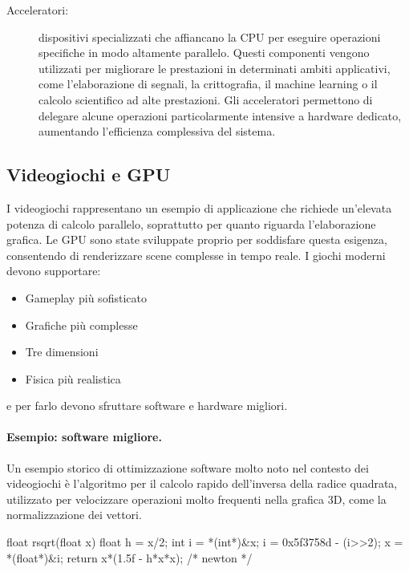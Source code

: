 \begin{description}
\item[Acceleratori:] dispositivi specializzati che affiancano la CPU per eseguire operazioni specifiche in modo altamente parallelo. 
Questi componenti vengono utilizzati per migliorare le prestazioni in determinati ambiti applicativi, come l'elaborazione di segnali, la crittografia, il machine learning o il calcolo scientifico ad alte prestazioni. 
Gli acceleratori permettono di delegare alcune operazioni particolarmente intensive a hardware dedicato, aumentando l'efficienza complessiva del sistema.

\end{description}

\subsection{Videogiochi e GPU}
I videogiochi rappresentano un esempio di applicazione che richiede un'elevata potenza di calcolo parallelo, soprattutto per quanto riguarda l'elaborazione grafica. Le GPU sono state sviluppate proprio per soddisfare questa esigenza, consentendo di renderizzare scene complesse in tempo reale. I giochi moderni devono supportare:
\begin{itemize}
    \item Gameplay più sofisticato
    \item Grafiche più complesse
    \item Tre dimensioni
    \item Fisica più realistica
\end{itemize}
e per farlo devono sfruttare software e hardware migliori.

\paragraph{Esempio: software migliore.}
Un esempio storico di ottimizzazione software molto noto nel contesto dei videogiochi è l'algoritmo per il calcolo rapido dell'inversa della radice quadrata, utilizzato per velocizzare operazioni molto frequenti nella grafica 3D, come la normalizzazione dei vettori.

\begin{code}[caption={Implementazione approssimata della radice quadrata inversa},label={lst:rsqrt}]
float rsqrt(float x)
{
    float h = x/2;
    int i = *(int*)&x;
    i = 0x5f3758d - (i>>2);
    x = *(float*)&i;
    return x*(1.5f - h*x*x); /* newton */
}
\end{code}

